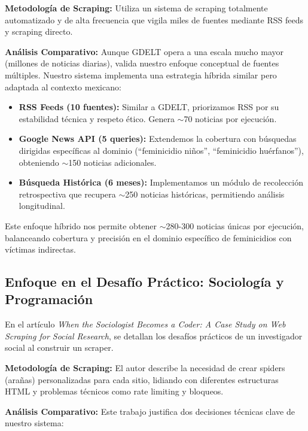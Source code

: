 \textbf{Metodología de Scraping:} Utiliza un sistema de scraping totalmente automatizado y de alta frecuencia que vigila miles de fuentes mediante RSS feeds y scraping directo.

\textbf{Análisis Comparativo:} Aunque GDELT opera a una escala mucho mayor (millones de noticias diarias), valida nuestro enfoque conceptual de fuentes múltiples. Nuestro sistema implementa una estrategia híbrida similar pero adaptada al contexto mexicano:

\begin{itemize}
    \item \textbf{RSS Feeds (10 fuentes):} Similar a GDELT, priorizamos RSS por su estabilidad técnica y respeto ético. Genera $\sim$70 noticias por ejecución.
    \item \textbf{Google News API (5 queries):} Extendemos la cobertura con búsquedas dirigidas específicas al dominio (``feminicidio niños'', ``feminicidio huérfanos''), obteniendo $\sim$150 noticias adicionales.
    \item \textbf{Búsqueda Histórica (6 meses):} Implementamos un módulo de recolección retrospectiva que recupera $\sim$250 noticias históricas, permitiendo análisis longitudinal.
\end{itemize}

Este enfoque híbrido nos permite obtener $\sim$280-300 noticias únicas por ejecución, balanceando cobertura y precisión en el dominio específico de feminicidios con víctimas indirectas.

\subsection{Enfoque en el Desafío Práctico: Sociología y Programación}
\label{subsec:sociologist_coder}
En el artículo \textit{When the Sociologist Becomes a Coder: A Case Study on Web Scraping for Social Research}, se detallan los desafíos prácticos de un investigador social al construir un scraper.

\textbf{Metodología de Scraping:} El autor describe la necesidad de crear spiders (arañas) personalizadas para cada sitio, lidiando con diferentes estructuras HTML y problemas técnicos como rate limiting y bloqueos.

\textbf{Análisis Comparativo:} Este trabajo justifica dos decisiones técnicas clave de nuestro sistema:


